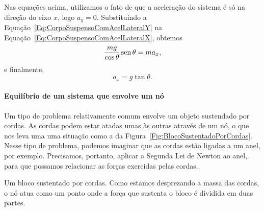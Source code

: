 \noindent{}Nas equações acima, utilizamos o fato de que a aceleração do sistema é só na direção do eixo $x$, logo $a_y = 0$.
Substituindo a Equação~\eqref{Eq:CorpoSuspensoComAcelLateralY} na Equação~\ref{Eq:CorpoSuspensoComAcelLateralX}, obtemos
\begin{equation}
    \frac{mg}{\cos\theta} \operatorname{sen}\theta = ma_x,
\end{equation}
%
e finalmente,
\begin{equation}
    a_x = g \tan\theta.
\end{equation}

\paragraph{Equilíbrio de um sistema que envolve um nó}

Um tipo de problema relativamente comum envolve um objeto sustendado por cordas. As cordas podem estar atadas umas às outras através de um nó, o que nos leva uma uma situação como a da Figura~\ref{Fig:BlocoSustentadoPorCordas}. Nesse tipo de problema, podemos imaginar que as cordas estão ligadas a um anel, por exemplo. Precisamos, portanto, aplicar a Segunda Lei de Newton ao anel, para que possamos relacionar as forças exercidas pelas cordas.

\begin{marginfigure}
\centering
{}
\caption{Um bloco sustentado por cordas. Como estamos desprezando a massa das cordas, o nó atua como um ponto onde a força que sustenta o bloco é dividida em duas partes.\label{Fig:BlocoSustentadoPorCordas}}
\end{marginfigure}

